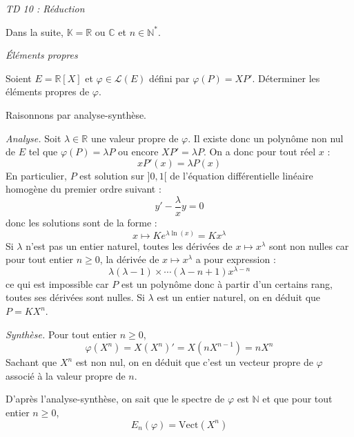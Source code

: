 \documentclass[a4paper,10pt]{report}
\begin{document}
\everymath{\displaystyle}
\begin{center}
\textit{{ {\huge TD 10 : Réduction}}}
\end{center}

\bigskip


\noindent Dans la suite, $\mathbb{K} = \mathbb{R}$ ou $\mathbb{C}$ et $n \in \mathbb{N}^*$.

\medskip

\begin{center}
\textit{{ {\large Éléments propres}}}
\end{center}

\medskip

\begin{Exercice}{} Soient $E = \mathbb{R}[X]$ et $\varphi \in \mathcal{L}(E)$ défini par $\varphi(P)=XP'$. Déterminer les éléments propres de $\varphi$.
\end{Exercice}

\corr Raisonnons par analyse-synthèse. 

\medskip

\noindent \textit{Analyse.} Soit $\lambda \in \mathbb{R}$ une valeur propre de $\varphi$. Il existe donc un polynôme non nul de $E$ tel que $\varphi(P)=\lambda P$ ou encore $XP' = \lambda P$. On a donc pour tout réel $x$ :
$$ x P'(x) = \lambda P(x)$$
En particulier, $P$ est solution sur $]0,1[$ de l'équation différentielle linéaire homogène du premier ordre suivant :
$$ y' - \dfrac{\lambda}{x} y = 0$$
donc les solutions sont de la forme :
$$ x \mapsto K e^{\lambda \ln(x)} = K x^{\lambda}$$
Si $\lambda$ n'est pas un entier naturel, toutes les dérivées de $x \mapsto x^{\lambda}$ sont non nulles car pour tout entier $n \geq 0$, la dérivée de $x \mapsto x^{\lambda}$ a pour expression :
$$ \lambda (\lambda-1) \times \cdots (\lambda-n+1) x^{\lambda -n}$$
ce qui est impossible car $P$ est un polynôme donc à partir d'un certains rang, toutes ses dérivées sont nulles. Si $\lambda$ est un entier naturel, on en déduit que $P= K X^n$.

\medskip

\noindent \textit{Synthèse.} Pour tout entier $n \geq 0$,
$$ \varphi(X^n) = X(X^n)'=X(nX^{n-1})=nX^n$$
Sachant que $X^n$ est non nul, on en déduit que c'est un vecteur propre de $\varphi$ associé à la valeur propre de $n$.

\medskip

\noindent D'après l'analyse-synthèse, on sait que le spectre de $\varphi$ est $\mathbb{N}$ et que pour tout entier $n \geq 0$,
$$ E_{n}(\varphi) = \textrm{Vect}(X^n)$$
\end{document}

